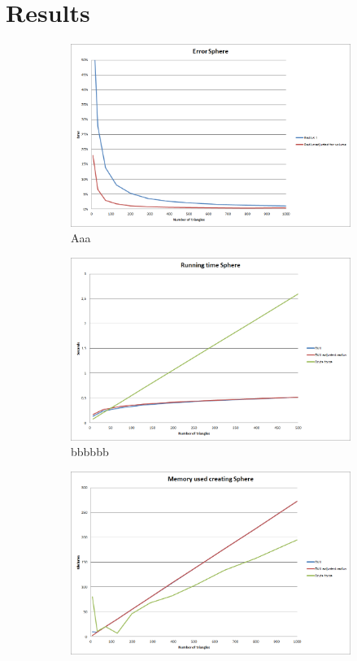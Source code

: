 \documentclass[11pt,twoside,a4paper]{report}
\begin{document}
\chapter{Results}
\begin{figure}[h] \centering 
	\begin{subfigure}[h]{0.49\textwidth}
	\includegraphics[width=\textwidth]{images/chart_sphere_error}
	\caption{Aaa} \label{fig:gull} \end{subfigure}
    \begin{subfigure}[h]{0.49\textwidth}
	\includegraphics[width=\textwidth]{images/chart_sphere_running_time}
    \caption{bbbbbb} \label{fig:tiger} \end{subfigure}
	\begin{subfigure}[h]{0.49\textwidth} 
	\includegraphics[width=\textwidth]{images/chart_sphere_creation_memory}

\end{subfigure}
\end{figure}
\end{document}
